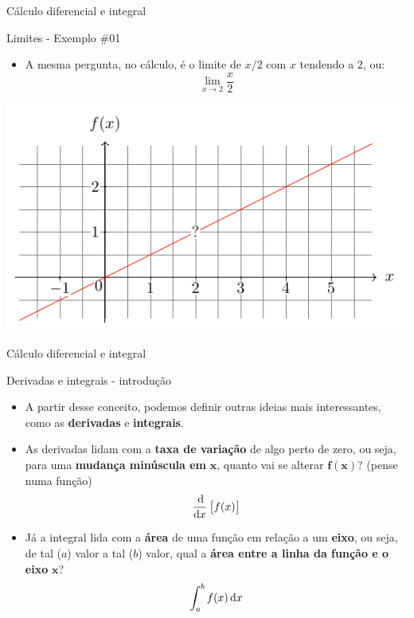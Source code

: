 \begin{frame}{Cálculo diferencial e integral}
	\begin{block}{Limites - Exemplo \#01}
		\begin{itemize}
			\item A mesma pergunta, no cálculo, é o limite de $ x/2 $ com $ x $ tendendo a $ 2 $, ou:\[ \lim\limits_{x\to 2}\dfrac{x}{2} \]
			
		\end{itemize}
	\end{block}
	
	
	\centering
	\includegraphics[width=0.8\linewidth]{Figuras/Ch13/lim1}
\end{frame}


\begin{frame}{Cálculo diferencial e integral}
	\begin{block}{Derivadas e integrais - introdução}
		\begin{itemize}
			\item A partir desse conceito, podemos definir outras ideias mais interessantes, como as \textbf{derivadas} e \textbf{integrais}.
			\item As derivadas lidam com a \textbf{taxa de variação} de algo perto de zero, ou seja, para uma \textbf{mudança minúscula em} $ \bm{x} $, quanto vai se alterar $ \bm{f(x)} $? (pense numa função)
			\[ \dfrac{\dif}{\dif x}\sbr{f(x)} \]
			\item Já a integral lida com a \textbf{área} de uma função em relação a um \textbf{eixo}, ou seja, de tal ($ a $) valor a tal ($ b $) valor, qual a \textbf{área entre a linha da função e o eixo} $ \bm{x} $?
			\[ \int_{a}^{b}f(x)\dif x \]
		\end{itemize}
	\end{block}
\end{frame}


